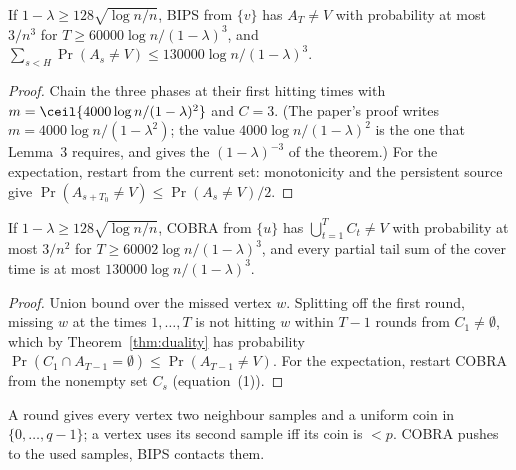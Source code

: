 \begin{theorem}[Theorem~2]\label{thm:crr-bips}
\leanok{}
If $1-\lambda\ge128\sqrt{\log n/n}$, BIPS from $\{v\}$ has $A_T\ne V$ with probability at most
$3/n^3$ for $T\ge60000\log n/(1-\lambda)^3$, and $\sum_{s<H}\Pr(A_s\ne V)\le
130000\log n/(1-\lambda)^3$.
\end{theorem}
\begin{proof}\leanok
Chain the three phases at their first hitting times with $m=\ceil{4000\log n/(1-\lambda)^2}$ and
$C=3$. (The paper's proof writes $m=4000\log n/(1-\lambda^2)$; the value
$4000\log n/(1-\lambda)^2$ is the one that Lemma~3 requires, and gives the $(1-\lambda)^{-3}$
of the theorem.) For the expectation, restart from the current
set: monotonicity and the persistent source give $\Pr(A_{s+T_0}\ne V)\le\Pr(A_s\ne V)/2$.
\end{proof}

\begin{theorem}[Theorem~1]\label{thm:crr-cobra}
\leanok{}
If $1-\lambda\ge128\sqrt{\log n/n}$, COBRA from $\{u\}$ has $\bigcup_{t=1}^T C_t\ne V$ with
probability at most $3/n^2$ for $T\ge60002\log n/(1-\lambda)^3$, and every partial tail sum of
the cover time is at most $130000\log n/(1-\lambda)^3$.
\end{theorem}
\begin{proof}\leanok
Union bound over the missed vertex $w$. Splitting off the first round, missing $w$ at the times
$1,\dots,T$ is not hitting $w$ within $T-1$ rounds from $C_1\ne\emptyset$, which by
Theorem~\ref{thm:duality} has probability $\Pr(C_1\cap A_{T-1}=\emptyset)\le\Pr(A_{T-1}\ne V)$.
For the expectation, restart COBRA from the nonempty set $C_s$ (equation~(1)).
\end{proof}

\begin{definition}\label{def:coin}
\leanok{}
A round gives every vertex two neighbour samples and a uniform coin in $\{0,\dots,q-1\}$; a vertex
uses its second sample iff its coin is $<p$. COBRA pushes to the used samples, BIPS contacts them.
\end{definition}

